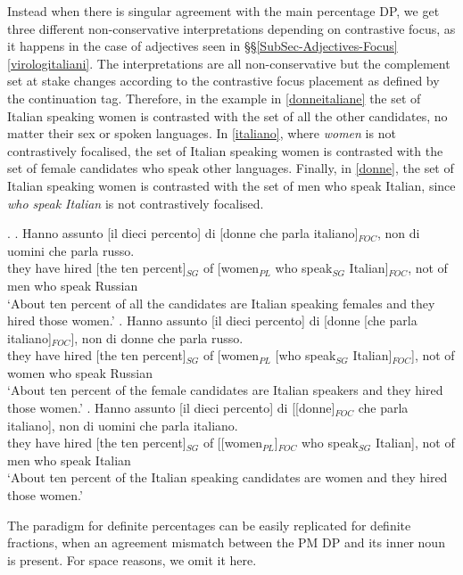 \documentclass[charis, linguex]{glossa}
\begin{document}
Instead when there is singular agreement with the main percentage DP, we get three different non-conservative interpretations depending on contrastive focus, as it happens in the case of adjectives seen in \S\S\ref{SubSec-Adjectives-Focus} \ref{virologitaliani}. The interpretations are all non-conservative but the complement set at stake changes according to the contrastive focus placement as defined by the continuation tag. Therefore, in the example in \ref{donneitaliane} the set of Italian speaking women is contrasted with the set of all the other candidates, no matter their sex or spoken languages. In \ref{italiano}, where \textit{women} is not contrastively focalised, the set of Italian speaking women is contrasted with the set of female candidates who speak other languages. Finally, in \ref{donne}, the set of Italian speaking women is contrasted with the set of men who speak Italian, since \textit{who speak Italian} is not contrastively focalised.

\ex. \ag. Hanno assunto [il dieci percento] di [donne che parla italiano]$_{FOC}$, non di uomini che parla russo. \\
      {they have} hired [the ten percent]$_{SG}$ of [women$_{PL}$ who speak$_{SG}$ Italian]$_{FOC}$, not of men who speak Russian \\
	   \glt `About ten percent of all the candidates are Italian speaking females and they hired those women.' \label{donneitaliane}		
\bg. Hanno assunto [il dieci percento] di [donne [che parla  italiano]$_{FOC}$], non di donne che parla russo. \\
     {they have} hired [the ten percent]$_{SG}$ of [women$_{PL}$ [who speak$_{SG}$ Italian]$_{FOC}$], not of women who speak Russian \\
	  \glt `About ten percent of the female candidates are Italian speakers and they hired those women.' \label{italiano}
\cg. Hanno assunto [il dieci percento] di [[donne]$_{FOC}$ che parla  italiano], non di uomini che parla italiano. \\
	      {they have} hired [the ten percent]$_{SG}$ of [[women$_{PL}$]$_{FOC}$ who speak$_{SG}$ Italian], not of men who speak Italian \\
	  \glt	 `About ten percent of the Italian speaking candidates are women and they hired those women.' \label{donne}
 
	 
The paradigm for definite percentages can be easily replicated for definite fractions, when an agreement mismatch between the PM DP and its inner noun is present. For space reasons, we omit it here. 
\end{document}
